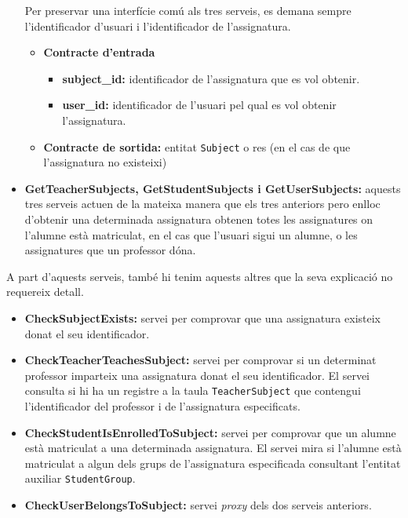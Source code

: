 \begin{itemize}
			Per preservar una interfície comú als tres serveis, es demana sempre l'identificador d'usuari i l'identificador de l'assignatura.
			
			\begin{itemize}
					\item \textbf{Contracte d'entrada}
						\begin{itemize}
							\item \textbf{subject\_id:} identificador de l'assignatura que es vol obtenir.
							\item \textbf{user\_id:} identificador de l'usuari pel qual es vol obtenir l'assignatura.
						\end{itemize}
					\item \textbf{Contracte de sortida:} entitat \texttt{Subject} o res (en el cas de que l'assignatura no existeixi)
				\end{itemize}
			\item \textbf{GetTeacherSubjects, GetStudentSubjects i GetUserSubjects:} aquests tres serveis actuen de la mateixa manera que els tres anteriors pero enlloc d'obtenir una determinada assignatura obtenen totes les assignatures on l'alumne està matriculat, en el cas que l'usuari sigui un alumne, o les assignatures que un professor dóna.
		\end{itemize}
		
		A part d'aquests serveis, també hi tenim aquests altres que la seva explicació no requereix detall.
		
		\begin{itemize}
			\item \textbf{CheckSubjectExists:} servei per comprovar que una assignatura existeix donat el seu identificador.
			\item \textbf{CheckTeacherTeachesSubject:} servei per comprovar si un determinat professor imparteix una assignatura donat el seu identificador. El servei consulta si hi ha un registre a la taula \texttt{TeacherSubject} que contengui l'identificador del professor i de l'assignatura especificats.
			
			\item \textbf{CheckStudentIsEnrolledToSubject:} servei per comprovar que un alumne està matriculat a una determinada assignatura. El servei mira si l'alumne està matriculat a algun dels grups de l'assignatura especificada consultant l'entitat auxiliar \texttt{StudentGroup}.
			
			\item \textbf{CheckUserBelongsToSubject:} servei \emph{proxy} dels dos serveis anteriors.
		\end{itemize}
		
